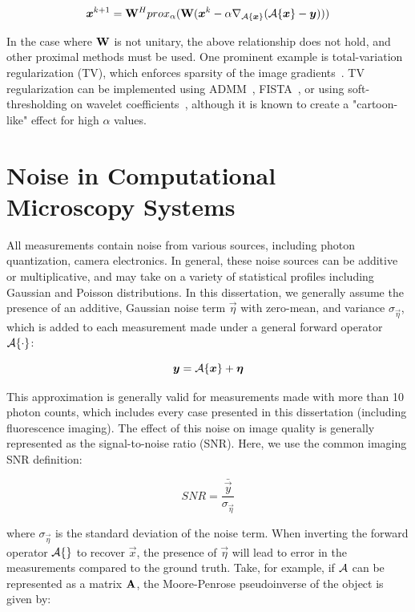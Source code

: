 \begin{equation}
    \bm{x}^{k+1} = \mathbf{W}^H prox_{\alpha}(\mathbf{W} (\bm{x}^{k} - \alpha \nabla_{\mathcal{A}\{\bm{x}\}} (\mathcal{A}\{\bm{x}\} - \bm{y})))
\end{equation}

In the case where $\mathbf{W}$ is not unitary, the above relationship does not hold, and other proximal methods must be used. One prominent example is total-variation regularization (TV), which enforces sparsity of the image gradients~\cite{rudin1992nonlinear}. TV regularization can be implemented using ADMM~\cite{wahlberg2012admm}, FISTA~\cite{beck2009fast}, or using soft-thresholding on wavelet coefficients~\cite{kamilov2012wavelet}, although it is known to create a "cartoon-like" effect for high $\alpha$ values.

\section{Noise in Computational Microscopy Systems}\label{sec:intro_noise}
All measurements contain noise from various sources, including photon quantization, camera electronics. In general, these noise sources can be additive or multiplicative, and may take on a variety of statistical profiles including Gaussian and Poisson distributions. In this dissertation, we generally assume the presence of an additive, Gaussian noise term $\vec{\eta}$ with zero-mean, and variance $\sigma_{\vec{\eta}}$, which is added to each measurement made under a general forward operator $\mathcal{A}\{\cdot\}$:

\begin{equation}\label{eq:intro_forward_model}
    \bm{y} = \mathcal{A}\{\bm{x}\} + \bm{\eta}
\end{equation}

This approximation is generally valid for measurements made with more than 10 photon counts, which includes every case presented in this dissertation (including fluorescence imaging). The effect of this noise on image quality is generally represented as the signal-to-noise ratio (SNR). Here, we use the common imaging SNR definition:

\begin{equation}
    \label{eq:intro_snr}
    SNR = \frac{\bar{\vec{y}}}{\sigma_{\vec{\eta}}}
\end{equation}

\noindent where $\sigma_{\vec{\eta}}$ is the standard deviation of the noise term. When inverting the forward operator $\mathcal{A}\{\}$ to recover $\vec{x}$, the presence of $\vec{\eta}$ will lead to error in the measurements compared to the ground truth. Take, for example, if $\mathcal{A}$ can be represented as a matrix $\mathbf{A}$, the Moore-Penrose pseudoinverse of the object is given by:

